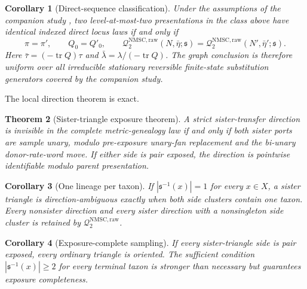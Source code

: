 \documentclass[11pt]{article}
\newtheorem{theorem}{Theorem}[section]
\newtheorem{corollary}[theorem]{Corollary}
\newcommand{\Qraw}{\mathcal Q^{\mathrm{NMSC,raw}}_2}
\newcommand{\tr}{\operatorname{tr}}
\begin{document}
\begin{corollary}[Direct-sequence classification]
\label{cor:sequence}
Under the assumptions of the companion study \citep{KriebelNMSCCore2026}, two level-at-most-two presentations in the class above have identical indexed direct locus laws if and only if
\[
 \pi=\pi',\qquad Q_0=Q'_0,
 \qquad
 \Qraw(N,\bar\eta;\mathfrak s)=\Qraw(N',\bar\eta';\mathfrak s).
\]
Here $\bar\tau=(-\tr Q)\tau$ and $\bar\lambda=\lambda/(-\tr Q)$.  The graph conclusion is therefore uniform over all irreducible stationary reversible finite-state substitution generators covered by the companion study.
\end{corollary}

The local direction theorem is exact.

\begin{theorem}[Sister-triangle exposure theorem]
\label{thm:triangle}
A strict sister-transfer direction is invisible in the complete metric-genealogy law if and only if both sister ports are sample unary, modulo pre-exposure unary-fan replacement and the bi-unary donor-rate-word move.  If either side is pair exposed, the direction is pointwise identifiable modulo parent presentation.
\end{theorem}

\begin{corollary}[One lineage per taxon]
\label{cor:one-sample}
If $|\mathfrak s^{-1}(x)|=1$ for every $x\in X$, a sister triangle is direction-ambiguous exactly when both side clusters contain one taxon.  Every nonsister direction and every sister direction with a nonsingleton side cluster is retained by $\Qraw$.
\end{corollary}

\begin{corollary}[Exposure-complete sampling]
\label{cor:exposure}
If every sister-triangle side is pair exposed, every ordinary triangle is oriented.  The sufficient condition $|\mathfrak s^{-1}(x)|\ge2$ for every terminal taxon is stronger than necessary but guarantees exposure completeness.
\end{corollary}
\end{document}
